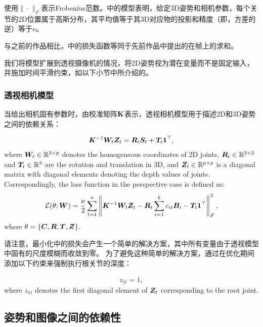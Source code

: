 使用$\|\cdot\|_F$表示Frobenius范数。中的模型表明，给定3D姿势和相机参数，每个关节的2D位置属于高斯分布，其平均值等于其3D对应物的投影和精度（即，方差的逆）等于$\nu$。

与之前的作品相比\cite{zhou2015sparse}，中的损失函数等同于先前作品中提出的\cite{zhou2015sparse}在帧上的求和。

我们将模型扩展到透视摄像机的情况，将2D姿势视为潜在变量而不是固定输入，并施加时间平滑约束，如以下小节中所介绍的。

\subsubsection{透视相机模型}

当给出相机固有参数时，由校准矩阵$\bf K$表示，透视相机模型用于描述2D和3D姿势之间的依赖关系：

\begin{align}\label{eq:model-fp}
    {\bm{K}}^{-1}{\bm{W}}_t{\bm{Z}}_t = {\bm{R}}_t{\bm{S}}_t + {\bm{T}}_t{\bm{1}}^\top,
\end{align}
where ${\bm{W}}_t\in\mathbb{R}^{3 \times p}$ denotes the homogeneous coordinates of 2D joints, ${\bm{R}}_t\in\mathbb{R}^{3 \times 3}$ and ${\bm{T}}_t\in\mathbb{R}^{3}$ are the rotation and translation in 3D, and ${\bm{Z}}_t\in\mathbb{R}^{p \times p}$ is a diagonal matrix with diagonal elements denoting the depth values of joints. Correspondingly, the loss function in the perspective case is defined as:
\begin{align}\label{eq:loss-fp}\small
\mathcal{L}(\theta;{\bm{W}}) = \frac{\nu}{2}\sum_{t=1}^{n}\left\|{\bm{K}}^{-1}{\bm{W}}_t{\bm{Z}}_t - {\bm{R}}_t\sum_{i=1}^{k} c_{it}{\bm{B}}_i - {\bm{T}}_t{\bm{1}}^\top\right\|_F^2,
\end{align}
where $\theta=\{{\bm{C}},{\bm{R}},{\bm{T}},{\bm{Z}}\}$.

请注意，最小化中的损失会产生一个简单的解决方案，其中所有变量由于透视模型中固有的尺度模糊而收敛到零。 为了避免这种简单的解决方案，通过在优化期间添加以下约束来强制执行根关节的深度：

\begin{align}
z_{1t}=1,
\end{align}
where $z_{1t}$ denotes the first diagonal element of ${\bm{Z}}_t$ corresponding to the root joint.

\subsection{姿势和图像之间的依赖性}

